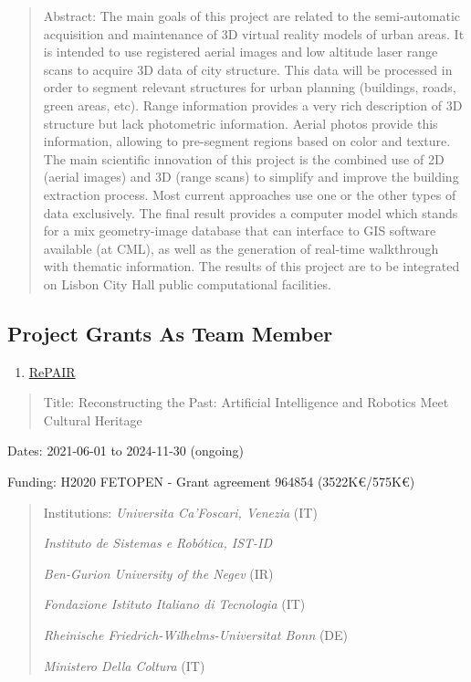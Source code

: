 \begin{quote}
Abstract: The main goals of this project are related to the
semi-automatic acquisition and maintenance of 3D virtual reality models
of urban areas. It is intended to use registered aerial images and low
altitude laser range scans to acquire 3D data of city structure. This
data will be processed in order to segment relevant structures for urban
planning (buildings, roads, green areas, etc). Range information
provides a very rich description of 3D structure but lack photometric
information. Aerial photos provide this information, allowing to
pre-segment regions based on color and texture. The main scientific
innovation of this project is the combined use of 2D (aerial images) and
3D (range scans) to simplify and improve the building extraction
process. Most current approaches use one or the other types of data
exclusively. The final result provides a computer model which stands for
a mix geometry-image database that can interface to GIS software
available (at CML), as well as the generation of real-time walkthrough
with thematic information. The results of this project are to be
integrated on Lisbon City Hall public computational facilities.
\end{quote}

\subsection{Project Grants As Team
Member}\label{project-grants-as-team-member}

\begin{enumerate}
\def\labelenumi{\arabic{enumi}.}
\item
  \ul{RePAIR}
\end{enumerate}

\begin{quote}
Title: Reconstructing the Past: Artificial Intelligence and Robotics
Meet Cultural Heritage
\end{quote}

Dates: 2021-06-01 to 2024-11-30 (ongoing)

Funding: H2020 FETOPEN - Grant agreement 964854 (3522K€/575K€)

\begin{quote}
Institutions: \emph{Universita Ca'Foscari, Venezia} (IT)

\emph{Instituto de Sistemas e Robótica, IST-ID}

\emph{Ben-Gurion University of the Negev} (IR)

\emph{Fondazione Istituto Italiano di Tecnologia} (IT)

\emph{Rheinische Friedrich-Wilhelms-Universitat Bonn} (DE)

\emph{Ministero Della Coltura} (IT)
\end{quote}

